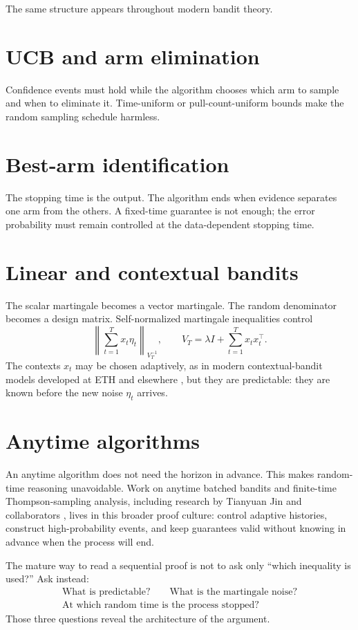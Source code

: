 \documentclass[en,nofont,11pt]{elegantbook}
\begin{document}
The same structure appears throughout modern bandit theory.

\section{UCB and arm elimination}

Confidence events must hold while the algorithm chooses which arm to sample and when to eliminate it. Time-uniform or pull-count-uniform bounds make the random sampling schedule harmless.

\section{Best-arm identification}

The stopping time is the output. The algorithm ends when evidence separates one arm from the others. A fixed-time guarantee is not enough; the error probability must remain controlled at the data-dependent stopping time.

\section{Linear and contextual bandits}

The scalar martingale becomes a vector martingale. The random denominator becomes a design matrix. Self-normalized martingale inequalities control \cite{abbasi2011improved}
\[
\left\|\sum_{t=1}^{T}x_t\eta_t\right\|_{V_T^{-1}},
\qquad
V_T=\lambda I+\sum_{t=1}^{T}x_tx_t^\top.
\]
The contexts $x_t$ may be chosen adaptively, as in modern contextual-bandit models developed at ETH and elsewhere \cite{kirschner2019context}, but they are predictable: they are known before the new noise $\eta_t$ arrives.

\section{Anytime algorithms}

An anytime algorithm does not need the horizon in advance. This makes random-time reasoning unavoidable. Work on anytime batched bandits and finite-time Thompson-sampling analysis, including research by Tianyuan Jin and collaborators \cite{jin2021batched,jin2022expts}, lives in this broader proof culture: control adaptive histories, construct high-probability events, and keep guarantees valid without knowing in advance when the process will end.

\begin{keyidea}
The mature way to read a sequential proof is not to ask only ``which inequality is used?'' Ask instead:
\[
\begin{gathered}
\text{What is predictable?}\qquad
\text{What is the martingale noise?}\\
\text{At which random time is the process stopped?}
\end{gathered}
\]
Those three questions reveal the architecture of the argument.
\end{keyidea}
\end{document}
